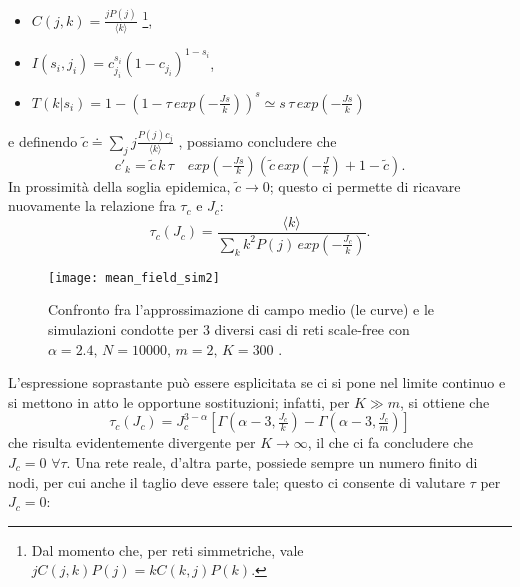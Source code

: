 \begin{itemize}
	\item $ C\left(j,k\right) = \frac{j P\left(j\right)}{\langle k \rangle} $ \footnote{Dal momento che, per reti simmetriche, vale $ j C\left(j,k\right) P\left(j\right) = k C\left(k,j\right) P\left(k\right) $.},
	\item $ I\left(s_i, j_i\right) = c_{j_i}^{s_i} \left(1 - c_{j_i}\right)^{1 - s_i} $,
	\item $ T\left(k|s_i\right) = 1 - \left(1 - \tau \, exp(- \tfrac{J s}{k})\right)^s \simeq s \, \tau \, exp(- \tfrac{J s}{k}) $ 
\end{itemize}
e definendo $ \tilde{c} \doteq \sum_j j \tfrac{P\left(j\right) c_j}{\langle k \rangle} $ \cite{Bagnoli2014}, possiamo concludere che 
\begin{equation}
	c'_k = \tilde{c} \, k \, \tau \quad exp(- \tfrac{J s}{k}) \left(\tilde{c} \, exp(- \tfrac{J}{k}) + 1 - \tilde{c}\right).
\end{equation}
In prossimità della soglia epidemica, $ \tilde{c} \to 0 $; questo ci permette di ricavare nuovamente la relazione fra $ \tau_c $ e $ J_c $:
\begin{equation}
	\tau_c\left(J_c\right) = \frac{\langle k \rangle}{\sum_k k^2 P\left(j\right) \, exp(-\tfrac{J_c}{k})}.
\end{equation}
\begin{figure}[t]
		\begin{center}
			\texttt{[image: mean\_field\_sim2]}
			\caption{Confronto fra l'approssimazione di campo medio (le curve) e le simulazioni condotte per $ 3 $ diversi casi di reti scale-free con $ \alpha = 2.4, \, N = 10000, \, m = 2, \, K = 300 $ \cite{Bagnoli2014} .}
			\label{fig:sim2}
		\end{center}
\end{figure}
L'espressione soprastante può essere esplicitata se ci si pone nel limite continuo e si mettono in atto le opportune sostituzioni; infatti, per $ K \gg m $, si ottiene che
\begin{equation}
	\tau_c \left(J_c \right) = J_{c}^{3 - \alpha} \left[ \Gamma \left( \alpha - 3, \tfrac{J_c}{k} \right) - \Gamma \left( \alpha - 3, \tfrac{J_c}{m}\right) \right] 	 
\end{equation}
che risulta evidentemente divergente per $ K \to \infty $, il che ci fa concludere che $ J_c = 0$ $\forall \tau$. Una rete reale, d'altra parte, possiede sempre un numero finito di nodi, per cui anche il taglio deve essere tale; questo ci consente di valutare $ \tau $ per $ J_c = 0 $:
